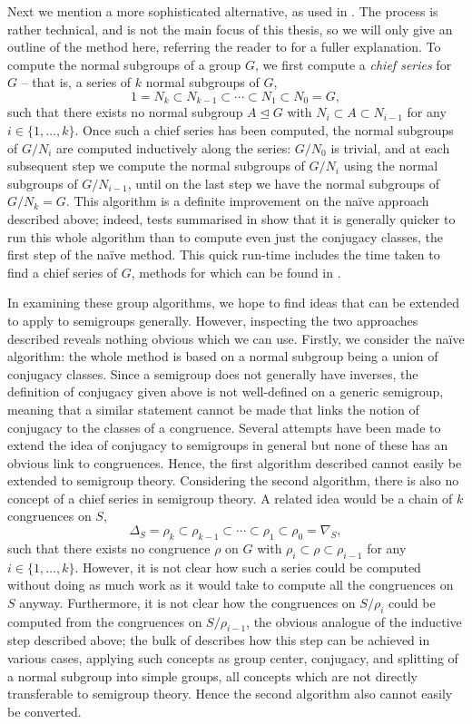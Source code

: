 Next we mention a more sophisticated alternative, as used in \GAP{}.  The process
is rather technical, and is not the main focus of this thesis, so we will only
give an outline of the method here, referring the reader to \cite{hulpke_1998}
for a fuller explanation.  To compute the normal subgroups of a group $G$, we
first compute a \textit{chief series} for $G$ -- that is, a series of $k$ normal
subgroups of $G$, 
$$1 = N_k
\subset N_{k-1}
\subset \cdots
\subset N_1
\subset N_0 = G,$$
such that there exists no normal subgroup $A \trianglelefteq G$ with
$N_i \subset A \subset N_{i-1}$ for any $i \in \{1, \ldots, k\}$.
Once such a chief series has been computed, the normal subgroups of $G / N_i$
are computed inductively along the series: $G / N_0$ is trivial, and at each
subsequent step we compute the normal subgroups of $G / N_i$ using the normal
subgroups of $G / N_{i-1}$, until on the last step we have the normal subgroups
of $G / N_k = G$.  This algorithm is a definite improvement on the na\"ive
approach described above; indeed, tests summarised in \cite[Table
1]{hulpke_1998} show that it is generally quicker to run this whole algorithm
than to compute even just the conjugacy classes, the first step of the na\"ive
method.  This quick run-time includes the time taken to find a chief series of
$G$, methods for which can be found in \cite{chief_series}.

In examining these group algorithms, we hope to find ideas that can be extended
to apply to semigroups generally.  However, inspecting the two approaches
described reveals nothing obvious which we can use.  Firstly, we consider the
na\"ive algorithm: the whole method is based on a normal subgroup being a union
of conjugacy classes.  Since a semigroup does not generally have inverses, the
definition of conjugacy given above is not well-defined on a generic semigroup,
meaning that a similar statement cannot be made that links the notion of
conjugacy to the classes of a congruence.  Several attempts have been made to
extend the idea of conjugacy to semigroups in general
\cite{conjugation_in_semigroups} but none of these has an obvious link to
congruences.  Hence, the first algorithm described cannot easily be extended to
semigroup theory.  Considering the second algorithm, there is also no concept of
a chief series in semigroup theory.  A related idea would be a chain of $k$
congruences on $S$,
$$\Delta_S = \rho_k
\subset \rho_{k-1}
\subset \cdots
\subset \rho_1
\subset \rho_0 = \nabla_S,$$
such that there exists no congruence $\rho$ on $G$ with
$\rho_i \subset \rho \subset \rho_{i-1}$ for any $i \in \{1, \ldots, k\}$.
However, it is not clear how such a series could be computed without doing as
much work as it would take to compute all the congruences on $S$ anyway.
Furthermore, it is not clear how the congruences on $S / \rho_i$ could be
computed from the congruences on $S / \rho_{i-1}$, the obvious analogue of the
inductive step described above; the bulk of \cite{hulpke_1998} describes how
this step can be achieved in various cases, applying such concepts as group
center, conjugacy, and splitting of a normal subgroup into simple groups, all
concepts which are not directly transferable to semigroup theory.  Hence the
second algorithm also cannot easily be converted.

